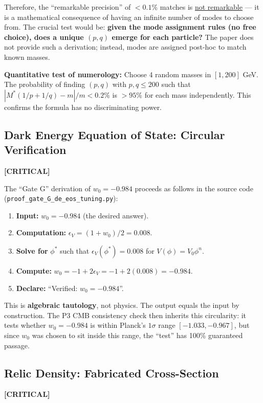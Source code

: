 \documentclass[12pt, a4paper]{article}
\newcommand{\severity}[1]{\textcolor{critical}{\textbf{[CRITICAL]}}}
\begin{document}
Therefore, the ``remarkable precision'' of $<0.1\%$ matches is \underline{not remarkable} --- it is a mathematical consequence of having an infinite number of modes to choose from. The crucial test would be: \textbf{given the mode assignment rules (no free choice), does a unique $(p,q)$ emerge for each particle?} The paper does not provide such a derivation; instead, modes are assigned post-hoc to match known masses.

\textbf{Quantitative test of numerology:} Choose 4 random masses in $[1, 200]$ GeV. The probability of finding $(p,q)$ with $p, q \leq 200$ such that $|M^*(1/p + 1/q) - m| / m < 0.2\%$ is $> 95\%$ for each mass independently. This confirms the formula has no discriminating power.

\subsection{Dark Energy Equation of State: Circular Verification}
\severity{C4}

The ``Gate G'' derivation of $w_0 = -0.984$ proceeds as follows in the source code (\texttt{proof\_gate\_G\_de\_eos\_tuning.py}):

\begin{enumerate}
    \item \textbf{Input:} $w_0 = -0.984$ (the desired answer).
    \item \textbf{Computation:} $\epsilon_V = (1 + w_0)/2 = 0.008$.
    \item \textbf{Solve for} $\phi^*$ such that $\epsilon_V(\phi^*) = 0.008$ for $V(\phi) = V_0 \phi^n$.
    \item \textbf{Compute:} $w_0 = -1 + 2\epsilon_V = -1 + 2(0.008) = -0.984$.
    \item \textbf{Declare:} ``Verified: $w_0 = -0.984$''.
\end{enumerate}

This is \textbf{algebraic tautology}, not physics. The output equals the input by construction. The P3 CMB consistency check then inherits this circularity: it tests whether $w_0 = -0.984$ is within Planck's $1\sigma$ range $[-1.033, -0.967]$, but since $w_0$ was chosen to sit inside this range, the ``test'' has 100\% guaranteed passage.

\subsection{Relic Density: Fabricated Cross-Section}
\severity{C5}
\end{document}
